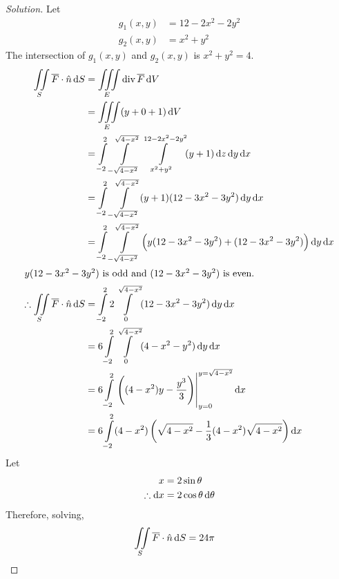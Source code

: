 \documentclass[fleqn, a4paper, 12pt]{article}
\newcommand{\divergence}{\mathrm{div\,}}
\theoremstyle{definition}
\theoremstyle{theorem}
\theoremstyle{remark}
\newenvironment{solution}
{\begin{proof}[Solution]\let\qed\relax}
	{\end{proof}}
\begin{document}
\begin{solution}
	Let
	\begin{align*}
		g_1(x,y) &= 12 - 2x^2 - 2y^2\\
		g_2(x,y) &= x^2 + y^2
	\end{align*}
	The intersection of $g_1(x,y)$ and $g_2(x,y)$ is $x^2 + y^2 = 4$.
	\begin{align*}
		\iint\limits_{S} \overline{F} \cdot \hat{n} \dif S &= \iiint\limits_{E} \divergence \overline{F} \dif V\\
		&= \iiint\limits_{E} (y + 0 + 1) \dif V\\
		&= \int\limits_{-2}^{2} \int\limits_{-\sqrt{4 - x^2}}^{\sqrt{4 - x^2}} \int\limits_{x^2 + y^2}^{12 - 2x^2 - 2y^2} (y + 1) \dif z \dif y \dif x\\
		&= \int\limits_{-2}^{2} \int\limits_{-\sqrt{4 - x^2}}^{\sqrt{4 - x^2}} (y + 1) (12 - 3x^2 - 3y^2) \dif y \dif x\\
		&= \int\limits_{-2}^{2} \int\limits_{-\sqrt{4 - x^2}}^{\sqrt{4 - x^2}} \left( y(12 - 3x^2 - 3y^2) + (12 - 3x^2 - 3y^2) \right) \dif y \dif x\\
		\intertext{$y(12 - 3x^2 - 3y^2)$ is odd and $(12 - 3x^2 - 3y^2)$ is even.}
		\therefore \iint\limits_{S} \overline{F} \cdot \hat{n} \dif S &= \int\limits_{-2}^{2} 2 \int\limits_{0}^{\sqrt{4 - x^2}} (12 - 3x^2 - 3y^2) \dif y \dif x\\
		&= 6 \int\limits_{-2}^{2} \int\limits_{0}^{\sqrt{4 - x^2}} (4 - x^2 - y^2) \dif y \dif x\\
		&= 6 \int\limits_{-2}^{2} \left. \left( (4 - x^2)y - \dfrac{y^3}{3} \right) \right|_{y = 0}^{y = \sqrt{4 - x^2}} \dif x\\
		&= 6 \int\limits_{-2}^{2} (4 - x^2) \left( \sqrt{4 - x^2} - \dfrac{1}{3} (4 - x^2) \sqrt{4 - x^2} \right) \dif x\\
	\end{align*}
	Let
	\begin{align*}
		x &= 2 \sin \theta\\
		\therefore \dif x &= 2 \cos \theta \dif \theta
	\end{align*}
	Therefore, solving,
	\begin{align*}
		\iint\limits_{S} \overline{F} \cdot \hat{n} \dif S &= 24 \pi
	\end{align*}
\end{solution}
\end{document}
